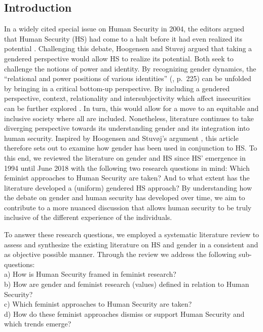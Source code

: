 \documentclass[10pt,a4paper]{article}
\begin{document}
\vspace*{10mm}
\begin{multicols}{2}

\section{Introduction}

\noindent In a widely cited special issue on Human Security in 2004, the editors argued that Human Security (HS) \citep{R1} had come to a halt before it had even realized its potential \citep{R2}. Challenging this debate, Hoogensen and Stuv{\o{}}j \citep{R3} argued that taking a gendered perspective would allow HS to realize its potential. Both seek to challenge the notions of power and identity. By recognizing gender dynamics, the ``relational and power positions of various identities'' (\cite{R3}, p.~225) can be unfolded by bringing in a critical bottom-up perspective. By including a gendered perspective, context, relationality and intersubjectivity which affect insecurities can be further explored  \citep{R3,R4}. In turn, this would allow for a move to an equitable and inclusive society where all are included. Nonetheless, literature continues to take diverging perspective towards its understanding gender and its integration into human security. Inspired by Hoogensen and Stuv{\o}j's argument \citep{R3}, this article therefore sets out to examine how gender has been used in conjunction to HS. To this end, we reviewed the literature on gender and HS since HS' emergence in 1994 until June 2018 with the following two research questions in mind: Which feminist approaches to Human Security are taken? And to what extent has the literature developed a (uniform) gendered HS approach? By understanding how the debate on gender and human security has developed over time, we aim to contribute to a more nuanced discussion that allows human security to be truly inclusive of the different experience of the individuals.

To answer these research questions, we employed a systematic literature review to assess and synthesize the existing literature on HS and gender in a consistent and as objective possible manner. Through the review we address the following sub-questions: \\
\noindent a) How is Human Security framed in feminist research? \\
b) How are gender and feminist research (values) defined in relation to Human Security? \\
c) Which feminist approaches to Human Security are taken? \\
d) How do these feminist approaches dismiss or support Human Security and which trends emerge? \\


\end{multicols}
\end{document}
